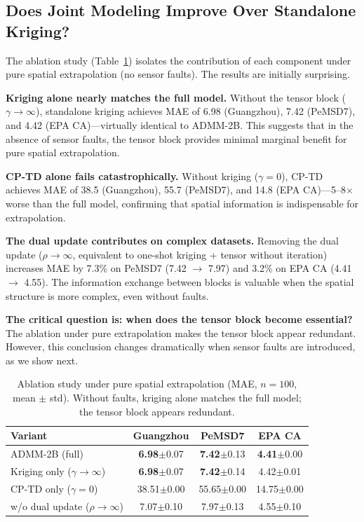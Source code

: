 \documentclass[journal]{IEEEtran}
\begin{document}
\subsection{Does Joint Modeling Improve Over Standalone Kriging?}\label{sec:results_q2}

The ablation study (Table~\ref{tab:ablation}) isolates the contribution of each component under pure spatial extrapolation (no sensor faults). The results are initially surprising.

\textbf{Kriging alone nearly matches the full model.}
Without the tensor block ($\gamma \to \infty$), standalone kriging achieves MAE of 6.98 (Guangzhou), 7.42 (PeMSD7), and 4.42 (EPA CA)---virtually identical to ADMM-2B. This suggests that in the absence of sensor faults, the tensor block provides minimal marginal benefit for pure spatial extrapolation.

\textbf{CP-TD alone fails catastrophically.}
Without kriging ($\gamma = 0$), CP-TD achieves MAE of 38.5 (Guangzhou), 55.7 (PeMSD7), and 14.8 (EPA CA)---5--8$\times$ worse than the full model, confirming that spatial information is indispensable for extrapolation.

\textbf{The dual update contributes on complex datasets.}
Removing the dual update ($\rho \to \infty$, equivalent to one-shot kriging + tensor without iteration) increases MAE by 7.3\% on PeMSD7 (7.42 $\to$ 7.97) and 3.2\% on EPA CA (4.41 $\to$ 4.55). The information exchange between blocks is valuable when the spatial structure is more complex, even without faults.

\textbf{The critical question is: when does the tensor block become essential?}
The ablation under pure extrapolation makes the tensor block appear redundant. However, this conclusion changes dramatically when sensor faults are introduced, as we show next.

\begin{table}[htbp]
  \centering
  \caption{Ablation study under pure spatial extrapolation (MAE, $n{=}100$, mean $\pm$ std). Without faults, kriging alone matches the full model; the tensor block appears redundant.}
  \label{tab:ablation}
  \begin{tabular}{lccc}
    \toprule
    Variant & Guangzhou & PeMSD7 & EPA CA \\
    \midrule
    ADMM-2B (full) & \textbf{6.98}$\pm$0.07 & \textbf{7.42}$\pm$0.13 & \textbf{4.41}$\pm$0.00 \\
    Kriging only ($\gamma\!\to\!\infty$) & \textbf{6.98}$\pm$0.07 & \textbf{7.42}$\pm$0.14 & 4.42$\pm$0.01 \\
    CP-TD only ($\gamma\!=\!0$) & 38.51$\pm$0.00 & 55.65$\pm$0.00 & 14.75$\pm$0.00 \\
    w/o dual update ($\rho\!\to\!\infty$) & 7.07$\pm$0.10 & 7.97$\pm$0.13 & 4.55$\pm$0.10 \\
    \bottomrule
  \end{tabular}
\end{table}
\end{document}
